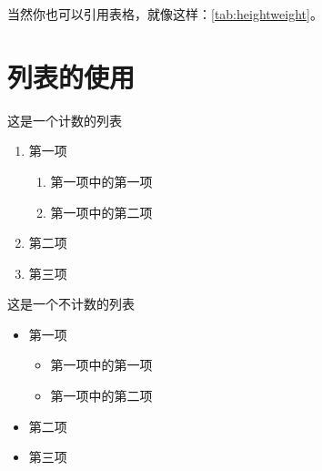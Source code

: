 \documentclass[supercite]{HustGraduTrans}
\begin{document}
    当然你也可以引用表格，就像这样：\autoref{tab:heightweight}。
    
    \section{列表的使用}
    这是一个计数的列表
    \begin{enumerate}
        \item 第一项
            \begin{enumerate}
                \item 第一项中的第一项
                \item 第一项中的第二项
            \end{enumerate}
        \item 第二项
        \item 第三项
    \end{enumerate}

    这是一个不计数的列表
    \begin{itemize}
        \item 第一项
        \begin{itemize}
            \item 第一项中的第一项
            \item 第一项中的第二项
        \end{itemize}
        \item 第二项
        \item 第三项
    \end{itemize}
    
        
    
    
    
\end{document}

